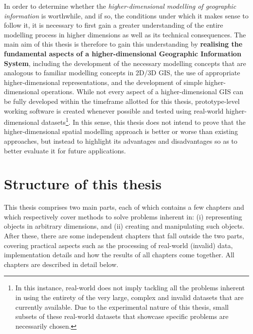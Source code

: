 In order to determine whether the \emph{higher-dimensional modelling of geographic information} is worthwhile, and if so, the conditions under which it makes sense to follow it, it is necessary to first gain a greater understanding of the entire modelling process in higher dimensions as well as its technical consequences.
The main aim of this thesis is therefore to gain this understanding by \textbf{realising the fundamental aspects of a higher-dimensional Geographic Information System}, including the development of the necessary modelling concepts that are analogous to familiar modelling concepts in 2D/3D GIS, the use of appropriate higher-dimensional representations, and the development of simple higher-dimensional operations.
While not every aspect of a higher-dimensional GIS can be fully developed within the timeframe allotted for this thesis, prototype-level working software is created whenever possible and tested using real-world higher-dimensional datasets\footnote{In this instance, real-world does not imply tackling all the problems inherent in using the entirety of the very large, complex and invalid datasets that are currently available.
Due to the experimental nature of this thesis, small subsets of these real-world datasets that showcase specific problems are necessarily chosen.}.
In this sense, this thesis does not intend to prove that the higher-dimensional spatial modelling approach is better or worse than existing approaches, but instead to highlight its advantages and disadvantages so as to better evaluate it for future applications.

\section{Structure of this thesis}
\label{se:about}

This thesis comprises two main parts, each of which contains a few chapters and which respectively cover methods to solve problems inherent in: (i) representing objects in arbitrary dimensions, and (ii) creating and manipulating such objects.
After these, there are some independent chapters that fall outside the two parts, covering practical aspects such as the processing of real-world (invalid) data, implementation details and how the results of all chapters come together.
All chapters are described in detail below.


